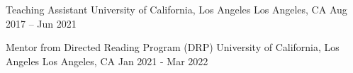 \begin{cventries}
  \cventry
    {Teaching Assistant} %
    {University of California, Los Angeles} %
    {Los Angeles, CA} %
    {Aug 2017 – Jun 2021} %
    {
    }

  \cventry
    {Mentor from Directed Reading Program (DRP)} %
    {University of California, Los Angeles} %
    {Los Angeles, CA} %
    {Jan 2021 - Mar 2022} %
    {
    }

\end{cventries}
